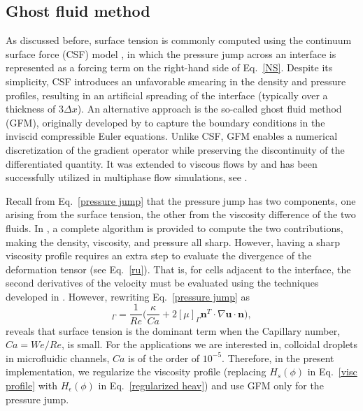 

\subsection{Ghost fluid method}
\label{subsec: gfm}

As discussed before, surface tension is commonly computed using the continuum surface force (CSF) model \citep{Brackbill_JCP_1992}, in which the pressure jump across an interface is represented as a forcing term on the right-hand side of Eq.\ \eqref{NS}. Despite its simplicity, CSF introduces an unfavorable smearing in the density and pressure profiles, resulting in an artificial spreading of the interface (typically over a thickness of $3\Delta x$). An alternative approach is the so-called ghost fluid method (GFM), originally developed by \cite{Fedkiw_JCP_1999} to capture the boundary conditions in the inviscid compressible Euler equations. Unlike CSF, GFM enables a numerical discretization of the gradient operator while preserving the discontinuity of the differentiated quantity. It was extended to viscous flows by \cite{Kang_JSC_2000} and has been successfully utilized in multiphase flow simulations, see \eg  \cite{Desjardins_JCP_2008, Coyajee_JCP_2009, Tanguy_2005}. 

Recall from Eq.\ \eqref{pressure jump} that the pressure jump has two components, one arising from the surface tension, the other from the viscosity difference of the two fluids. In \cite{Kang_JSC_2000}, a complete algorithm is provided to compute the two contributions, making the density, viscosity, and pressure all sharp. However, having a sharp viscosity profile requires an extra step to evaluate the divergence of the deformation tensor (see Eq.\ \eqref{ru}). That is, for cells adjacent to the interface, the second derivatives of the velocity must be evaluated using the techniques developed in \cite{Liu_JCP_2000, Kang_JSC_2000}. 
However, rewriting Eq.\ \eqref{pressure jump} as
\begin{equation}
    [p]_\Gamma = \frac{1}{Re} \bigg(\frac{\kappa}{Ca} + 2[\mu]_\Gamma {\bm n}^T \cdot \nabla {\bm u} \cdot {\bm n} \bigg),
  \label{pressure jump 2}
\end{equation}
\noindent reveals that surface tension is the dominant term when the Capillary number, $Ca=We/Re$, is small. For the applications we are interested in, \eg colloidal droplets in microfluidic channels, $Ca$ is of the order of $10^{-5}$. Therefore, in the present implementation, we regularize the viscosity profile (\ie replacing $H_s(\phi)$ in Eq.\ \eqref{visc profile} with $H_\epsilon(\phi)$ in Eq.\ \eqref{regularized heav}) and use GFM only for the pressure jump. 

